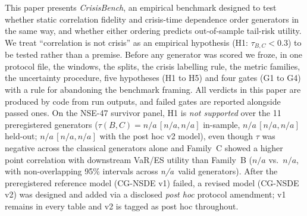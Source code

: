\documentclass[journal]{IEEEtran}
\newcommand{\pendingnum}{\textit{n/a}}
\providecommand{\nRiskGenerators}{\pendingnum}
\providecommand{\tauBCnseFull}{\pendingnum}
\providecommand{\tauBCnseFullLo}{\pendingnum}
\providecommand{\tauBCnseFullHi}{\pendingnum}
\providecommand{\tauBCnseFullPrereg}{\pendingnum}
\providecommand{\tauBCnseFullPreregLo}{\pendingnum}
\providecommand{\tauBCnseFullPreregHi}{\pendingnum}
\providecommand{\tauBCnseHeldPrereg}{\pendingnum}
\providecommand{\tauBCnseHeldPreregLo}{\pendingnum}
\providecommand{\tauBCnseHeldPreregHi}{\pendingnum}
\providecommand{\tauRiskB}{\pendingnum}
\providecommand{\tauRiskC}{\pendingnum}
\begin{document}
This paper presents \emph{CrisisBench}, an empirical benchmark designed to test whether static correlation
fidelity and crisis-time dependence order generators in the same way, and whether either ordering predicts
out-of-sample tail-risk utility. We treat ``correlation is not crisis'' as an empirical hypothesis (H1: $\tau_{B,C} < 0.3$) to be
tested rather than a premise. Before any generator was scored we froze, in one protocol file, the windows,
the splits, the crisis labelling rule, the metric families, the uncertainty procedure, five hypotheses (H1 to
H5) and four gates (G1 to G4) with a rule for abandoning the benchmark framing. All verdicts in this paper are
produced by code from run outputs, and failed gates are reported alongside passed ones. On the NSE-47 survivor
panel, H1 is \emph{not supported} over the 11 preregistered generators
($\tau(B,C)=\tauBCnseFullPrereg\,[\tauBCnseFullPreregLo,\tauBCnseFullPreregHi]$ in-sample,
$\tauBCnseHeldPrereg\,[\tauBCnseHeldPreregLo,\tauBCnseHeldPreregHi]$ held-out;
$\tauBCnseFull\,[\tauBCnseFullLo,\tauBCnseFullHi]$ with the post hoc v2 model), even though $\tau$ was
negative across the classical generators alone and Family~C showed a higher point correlation with downstream
VaR/ES utility than Family~B ($\tauRiskC$ vs.\ $\tauRiskB$, with non-overlapping 95\% intervals across
\nRiskGenerators\ valid generators). After the preregistered reference model (CG-NSDE v1) failed, a revised model (CG-NSDE v2) was
designed and added via a disclosed \emph{post hoc} protocol amendment; v1 remains in every table and v2 is
tagged as post hoc throughout.
\end{document}
